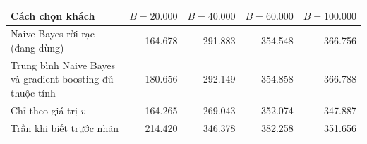 \begin{tabular}{p{6.2cm}rrrr}
\toprule
Cách chọn khách & $B = 20.000$ & $B = 40.000$ & $B = 60.000$ & $B = 100.000$ \\
\midrule
Naive Bayes rời rạc (đang dùng) & 164.678 & 291.883 & 354.548 & 366.756 \\
Trung bình Naive Bayes và gradient boosting đủ thuộc tính & 180.656 & 292.149 & 354.858 & 366.788 \\
Chỉ theo giá trị $v$ & 164.265 & 269.043 & 352.074 & 347.887 \\
Trần khi biết trước nhãn & 214.420 & 346.378 & 382.258 & 351.656 \\
\bottomrule
\end{tabular}
